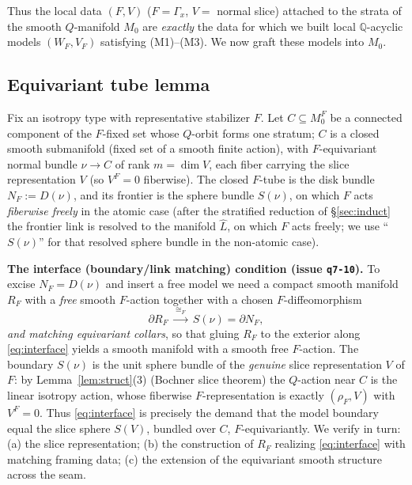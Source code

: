 \documentclass[12pt]{article}
\theoremstyle{definition}
\begin{document}
Thus the local data $(F,V)$ ($F=\Gamma_x$, $V=$ normal slice) attached to the
strata of the smooth $Q$-manifold $M_0$ are \emph{exactly} the data for which we
built local $\mathbb{Q}$-acyclic models $(W_F,V_F)$ satisfying (M1)--(M3). We now
graft these models into $M_0$.

\subsection{Equivariant tube lemma}

Fix an isotropy type with representative stabilizer $F$. Let $C\subseteq M_0^F$
be a connected component of the $F$-fixed set whose $Q$-orbit forms one stratum;
$C$ is a closed smooth submanifold (fixed set of a smooth finite action), with
$F$-equivariant normal bundle $\nu\to C$ of rank $m=\dim V$, each fiber carrying
the slice representation $V$ (so $V^F=0$ fiberwise). The closed
$F$-tube is the disk bundle $N_F:=D(\nu)$, and its frontier is the sphere bundle
$S(\nu)$, on which $F$ acts \emph{fiberwise freely} in the atomic case (after the
stratified reduction of \S\ref{sec:induct} the frontier link is resolved to the
manifold $\widehat L$, on which $F$ acts freely; we use ``$S(\nu)$'' for that
resolved sphere bundle in the non-atomic case).

\medskip
\noindent\textbf{The interface (boundary/link matching) condition (issue
\texttt{q7-10}).}
To excise $N_F=D(\nu)$ and insert a free model we need a compact smooth manifold
$R_F$ with a \emph{free} smooth $F$-action together with a chosen
$F$-diffeomorphism
\begin{equation}\label{eq:interface}
   \partial R_F\ \xrightarrow{\ \cong_F\ }\ S(\nu)=\partial N_F,
\end{equation}
\emph{and matching equivariant collars}, so that gluing $R_F$ to the exterior
along \eqref{eq:interface} yields a smooth manifold with a smooth free
$F$-action. The boundary $S(\nu)$ is the unit sphere bundle of the \emph{genuine}
slice representation $V$ of $F$: by Lemma~\ref{lem:struct}(3) (Bochner slice
theorem) the $Q$-action near $C$ is the linear isotropy action, whose fiberwise
$F$-representation is exactly $(\rho_F,V)$ with $V^F=0$. Thus
\eqref{eq:interface} is precisely the demand that the model boundary equal the
slice sphere $S(V)$, bundled over $C$, $F$-equivariantly. We verify in turn:
(a) the slice representation; (b) the construction of $R_F$ realizing
\eqref{eq:interface} with matching framing data; (c) the extension of the
equivariant smooth structure across the seam.
\end{document}
